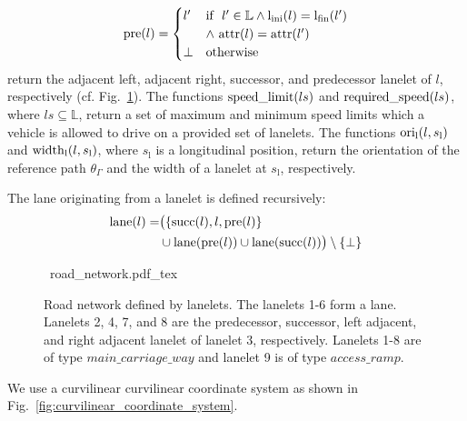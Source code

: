 \begin{equation}
\mathrm{pre}(l) =
\begin{cases} 
l' & \text{if } \ l' \in \mathbb{L} \land  \mathrm{l}_\mathrm{ini}(l) = \mathrm{l}_\mathrm{fin}(l')  \\ 
& \land \, \operatorname*{attr}(l) = \operatorname*{attr}(l')   \\ 
\bot & \text{otherwise} 
\end{cases}	
\end{equation}
return the adjacent left, adjacent right, successor, and predecessor lanelet of $l$, respectively (cf. Fig.~\ref{fig:road_network}). The functions $\operatorname*{speed\_limit}(ls)$ and  $\operatorname*{required\_speed}(ls)$, where $ls \subseteq \mathbb{L}$, return a set of maximum and minimum speed limits which a vehicle is allowed to drive on a provided set of lanelets. The functions $\mathrm{ori}_\mathrm{l}(l, s_\mathrm{l})$ and $\mathrm{width}_\mathrm{l}(l, s_\mathrm{l})$, where $s_\mathrm{l}$ is a longitudinal position, return the orientation of the reference path $\theta_\Gamma$ and the width of a lanelet at $s_\mathrm{l}$, respectively.
\begin{definition}[Lane]
	\label{def:lane}
	The lane originating from a lanelet is defined recursively:
	\begin{align*}
	\mathrm{lane}(l) = & \big( \{ \mathrm{succ}(l), l, \mathrm{pre}(l) \}  \\
	&\cup \mathrm{lane}(\mathrm{pre}(l)) \cup \mathrm{lane}(\mathrm{succ}(l)) \big) \setminus \{\bot\}
	\end{align*}
\end{definition}
\begin{figure}[!tpb]
	\def\svgwidth{0.75\textwidth}
	\centering
	\mbox{\footnotesize
		{road_network.pdf_tex}
	}
	\caption{Road network defined by lanelets. The lanelets 1-6 form a lane. Lanelets 2, 4, 7, and 8 are the predecessor, successor, left adjacent, and right adjacent lanelet of lanelet 3, respectively. Lanelets 1-8 are of type $main\_carriage\_way$ and lanelet 9 is of type $access\_ramp$.}
	\label{fig:road_network}
\end{figure}
We use a curvilinear curvilinear coordinate system \cite{Hery2017} as shown in Fig.~\ref{fig:curvilinear_coordinate_system}.

